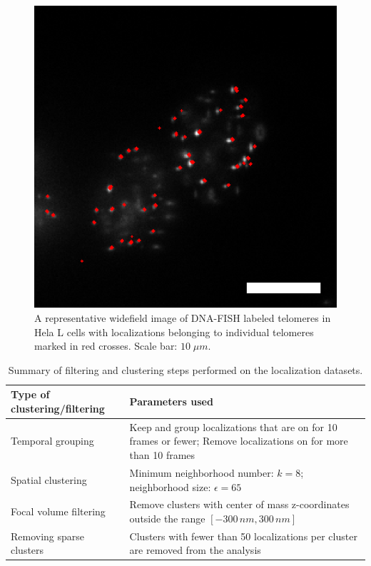 \documentclass[12pt, a4paper]{article}
\begin{document}
\begin{figure}
  \centering
  \includegraphics[scale = 0.35]{fig-widefield-overlay.png}
  \caption{A representative widefield image of DNA-FISH labeled telomeres in Hela L cells with localizations belonging to individual telomeres marked in red crosses. Scale bar: $10 \; \mu m$.}
  \label{fig-widefield-overlay}
\end{figure}

\begin{table}[htb]
\centering
\begin{tabular}{|l|p{10cm}|}
\hline
\textbf{Type of clustering/filtering} & \textbf{Parameters used}\\
\hline
Temporal grouping & Keep and group localizations that are on for 10 frames or fewer; Remove localizations on for more than 10 frames\\
\hline
Spatial clustering & Minimum neighborhood number: $k = 8$; neighborhood size: $\epsilon = 65$\\
\hline
Focal volume filtering & Remove clusters with center of mass z-coordinates outside the range $\left[ -300 \, nm, 300 \, nm \right]$\\
\hline
Removing sparse clusters & Clusters with fewer than 50 localizations per cluster are removed from the analysis\\
\hline
\end{tabular}\caption{Summary of filtering and clustering steps performed on the localization datasets.}

\end{table}
\end{document}
